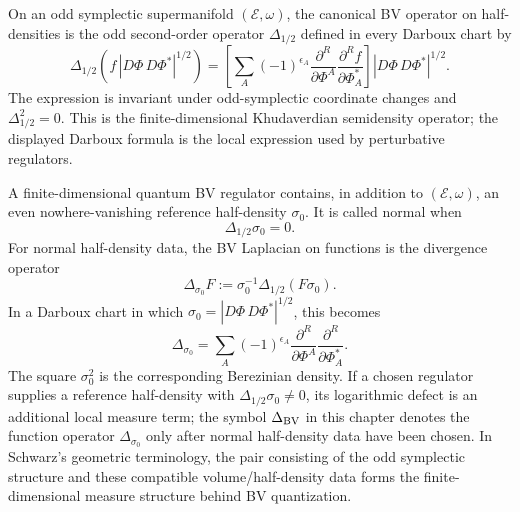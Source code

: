 \begin{definition}
\label{def:canonical-bv-half-density-operator}
On an odd symplectic supermanifold \((\mathcal E,\omega)\), the canonical BV
operator on half-densities is the odd second-order operator
\(\Delta_{1/2}\) defined in every Darboux chart by
\begin{equation}
  \Delta_{1/2}\!\left(f\,|D\Phi\,D\Phi^*|^{1/2}\right)
  =
  \left[
  \sum_A
  (-1)^{\epsilon_A}
  \frac{\partial^R}{\partial\Phi^A}
  \frac{\partial^R f}{\partial\Phi^*_A}
  \right]
  |D\Phi\,D\Phi^*|^{1/2}.
  \label{eq:canonical-half-density-bv-operator}
\end{equation}
The expression is invariant under odd-symplectic coordinate changes and
\(\Delta_{1/2}^2=0\).  This is the finite-dimensional Khudaverdian
semidensity operator; the displayed Darboux formula is the local expression
used by perturbative regulators.
\end{definition}

\begin{definition}
\label{def:normal-bv-half-density-data}
A finite-dimensional quantum BV regulator contains, in addition to
\((\mathcal E,\omega)\), an even nowhere-vanishing reference half-density
\(\sigma_0\).  It is called normal when
\[
  \Delta_{1/2}\sigma_0=0 .
\]
For normal half-density data, the BV Laplacian on functions is the divergence operator
\begin{equation}
  \Delta_{\sigma_0}F
  :=
  \sigma_0^{-1}\Delta_{1/2}(F\sigma_0).
  \label{eq:function-bv-laplacian-from-half-density}
\end{equation}
In a Darboux chart in which \(\sigma_0=|D\Phi\,D\Phi^*|^{1/2}\), this becomes
\begin{equation}
  \Delta_{\sigma_0}
  =
  \sum_A
  (-1)^{\epsilon_A}
  \frac{\partial^R}{\partial\Phi^A}
  \frac{\partial^R}{\partial\Phi^*_A}.
  \label{eq:bv-laplacian}
\end{equation}
The square \(\sigma_0^2\) is the corresponding Berezinian density.  If a
chosen regulator supplies a reference half-density with
\(\Delta_{1/2}\sigma_0\ne0\), its logarithmic defect is an additional local
measure term; the symbol \(\Delta_{\rm BV}\) in this chapter denotes the
function operator \(\Delta_{\sigma_0}\) only after normal half-density data
have been chosen.  In Schwarz's geometric terminology, the pair consisting of
the odd symplectic structure and these compatible volume/half-density data forms
the finite-dimensional measure structure behind BV quantization.
\end{definition}

